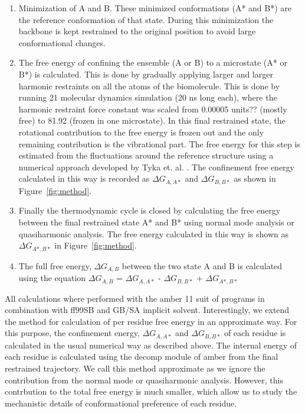 \documentclass[12pt]{article}
\newcommand{\Alberto}[1]{\color{ForestGreen}#1\normalcolor }
\begin{document}
\begin{enumerate}

\item  Minimization of A and B. These minimized conformations (A* and B*)
       are the reference conformation of that state. During this minimization the backbone is kept
       restrained to the original position to avoid large conformational changes.

   \item  The free energy of confining the ensemble (A or B) to a microstate (A* or B*) is
       calculated. This is done by gradually applying larger and larger
       harmonic restraints on all the atoms of the biomolecule. This is done by running 21 molecular dynamics simulation 
       (20 ns long each), where the harmonic restraint force constant was scaled from 0.00005
       \Alberto{units??}
       (mostly free) to 81.92 (frozen in one microstate). In this final restrained state, the
       rotational contribution to the free energy is frozen out
       and the only remaining contribution is the vibrational part. The free energy for this step is
       estimated from the fluctuations around
       the reference structure using a numerical
       approach developed by Tyka et. al. \cite{Tyka2006}. The confinement free energy calculated in
       this way is recorded as 
       $\Delta G_{A,A*}$ and $\Delta G_{B,B*}$ as shown in Figure~\ref{fig:method}.     

\item  Finally the thermodynamic cycle is closed by calculating the free energy between the final
       restrained state A* and B* using normal mode analysis or quasiharmonic analysis. The free energy calculated in 
       this way is shown as $\Delta G_{A*,B*}$ in Figure~\ref{fig:method}.

\item  The full free energy, $\Delta G_{A,B}$ between the two state A and B is calculated using the equation 
       $\Delta G_{A,B}$ = $\Delta G_{A,A*}$ - $\Delta G_{B,B*}$ + $\Delta G_{A*,B*}$  

\end{enumerate}

All calculations where performed with the amber 11 suit of programs in combination with ff99SB and
GB/SA implicit solvent. Interestingly, we extend the method for calculation of per residue free
energy in an approximate way. For this purpose, the confinement energy, $\Delta G_{A,A*}$ and
$\Delta G_{B,B*}$ of each residue is calculated in the usual numerical way as described above. The
internal energy of each residue is calculated using the decomp module of amber from the final
restrained trajectory. We call this method approximate as we ignore the contribution from the normal
mode or quasiharmonic analysis. However, this contrbution to the total free energy is much smaller, 
which allow us to study the mechanistic details of conformational preference of each residue.      
\end{document}
